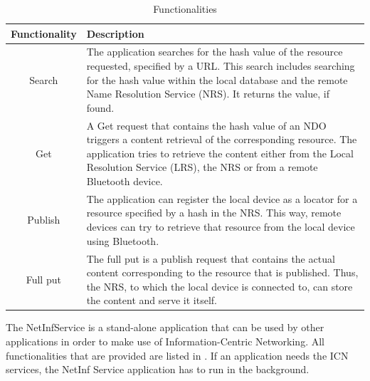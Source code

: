 \begin{table}
\centering
 \begin{tabular}{|c|p{10cm}|}\hline
  Functionality	& Description \\\hline
  Search	& The application searches for the hash value of the resource requested, specified by a URL. This search includes
		  searching for the hash value within the local database and the remote Name Resolution Service (NRS).
		  It returns the value, if found.\\\hline
  Get		& A Get request that contains the hash value of an NDO triggers a content retrieval of the
		  corresponding resource. The application tries to retrieve the content either from the Local Resolution Service (LRS), the NRS
		  or from a remote Bluetooth device.\\\hline
  Publish	& The application can register the local device as a locator for a resource specified by a hash in the NRS. This way, remote
		  devices can try to retrieve that resource from the local device using Bluetooth. \\\hline
  Full put	& The full put is a publish request that contains the actual content corresponding to the resource that is published. Thus,
		  the NRS, to which the local device is connected to, can store the content and serve it itself.\\\hline
		  
 \end{tabular}
  \caption{Functionalities}\label{tab:netinffunctionalities}
\end{table}

The NetInfService is a stand-alone application that can be used by other
applications in order to make use of Information-Centric Networking. All functionalities
that are provided are listed in . If an application
needs the ICN services, the NetInf Service application has to run in the background.\\


